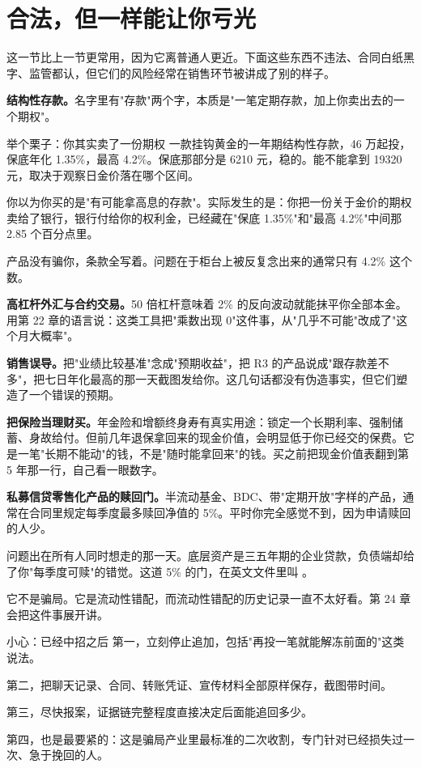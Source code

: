\section{合法，但一样能让你亏光}

这一节比上一节更常用，因为它离普通人更近。下面这些东西不违法、合同白纸黑字、监管都认，但它们的风险经常在销售环节被讲成了别的样子。

\textbf{结构性存款。}名字里有"存款"两个字，本质是"一笔定期存款，加上你卖出去的一个期权"。

\begin{egbox}{举个栗子：你其实卖了一份期权}
一款挂钩黄金的一年期结构性存款，46 万起投，保底年化 1.35\%，最高 4.2\%。保底那部分是 6210 元，稳的。能不能拿到 19320 元，取决于观察日金价落在哪个区间。

你以为你买的是"有可能拿高息的存款"。实际发生的是：你把一份关于金价的期权卖给了银行，银行付给你的权利金，已经藏在"保底 1.35\%"和"最高 4.2\%"中间那 2.85 个百分点里。

产品没有骗你，条款全写着。问题在于柜台上被反复念出来的通常只有 4.2\% 这个数。

\end{egbox}

\textbf{高杠杆外汇与合约交易。}50 倍杠杆意味着 2\% 的反向波动就能抹平你全部本金。用第 22 章的语言说：这类工具把"乘数出现 0"这件事，从"几乎不可能"改成了"这个月大概率"。

\textbf{销售误导。}把"业绩比较基准"念成"预期收益"，把 R3 的产品说成"跟存款差不多"，把七日年化最高的那一天截图发给你。这几句话都没有伪造事实，但它们塑造了一个错误的预期。

\textbf{把保险当理财买。}年金险和增额终身寿有真实用途：锁定一个长期利率、强制储蓄、身故给付。但前几年退保拿回来的现金价值，会明显低于你已经交的保费。它是一笔"长期不能动"的钱，不是"随时能拿回来"的钱。买之前把现金价值表翻到第 5 年那一行，自己看一眼数字。

\textbf{私募信贷零售化产品的赎回门。}半流动基金、BDC、带"定期开放"字样的产品，通常在合同里规定每季度最多赎回净值的 5\%。平时你完全感觉不到，因为申请赎回的人少。

问题出在所有人同时想走的那一天。底层资产是三五年期的企业贷款，负债端却给了你"每季度可赎"的错觉。这道 5\% 的门，在英文文件里叫 。

它不是骗局。它是流动性错配，而流动性错配的历史记录一直不太好看。第 24 章会把这件事展开讲。

\begin{warnbox}{小心：已经中招之后}
第一，立刻停止追加，包括"再投一笔就能解冻前面的"这类说法。

第二，把聊天记录、合同、转账凭证、宣传材料全部原样保存，截图带时间。

第三，尽快报案，证据链完整程度直接决定后面能追回多少。

第四，也是最要紧的：这是骗局产业里最标准的二次收割，专门针对已经损失过一次、急于挽回的人。

\end{warnbox}

